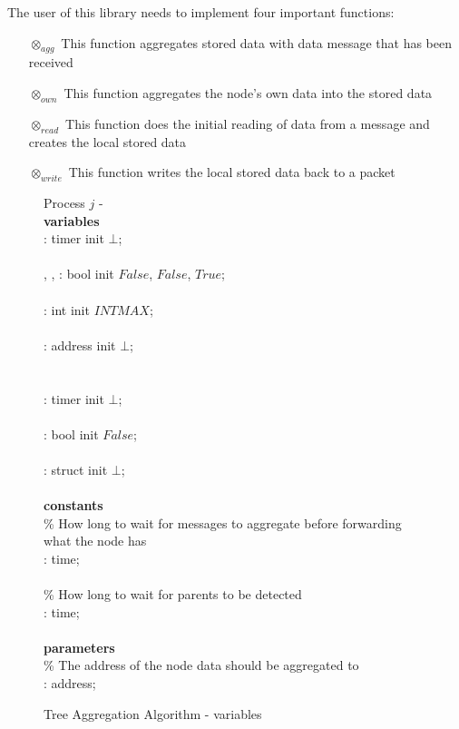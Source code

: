 The user of this library needs to implement four important functions:
\begin{enumerate}
\item[$\otimes_{agg}$] This function aggregates stored data with data message that has been received
\item[$\otimes_{own}$] This function aggregates the node's own data into the stored data
\item[$\otimes_{read}$] This function does the initial reading of data from a message and creates the local stored data
\item[$\otimes_{write}$] This function writes the local stored data back to a packet
\end{enumerate}


\begin{figure}[H]
  \centering
  \begin{boxedminipage}{\linewidth}
    \null Process $j$ - \\
    \null \textbf{variables}\\
    \null\qq {}: timer init $\bot$;\\~\\
    \null\qq {}, , : bool init $False$, $False$, $True$;\\~\\
    \null\qq {}: int init $INTMAX$;\\~\\
    \null\qq {}: address init $\bot$;\\~\\~\\
    \null\qq {}: timer init $\bot$;\\~\\
    \null\qq {}: bool init $False$;\\~\\
    \null\qq {}: struct init $\bot$;\\~\\
    \null \textbf{constants}\\
    \null\qq \% How long to wait for messages to aggregate before forwarding what the node has\\
    \null\qq {}: time;\\~\\
    \null\qq \% How long to wait for parents to be detected\\
    \null\qq {}: time;\\~\\
    \null \textbf{parameters}\\
    \null\qq \% The address of the node data should be aggregated to\\
    \null\qq {}: address;\\
  \end{boxedminipage}
  \caption{Tree Aggregation Algorithm - variables}
\end{figure}

